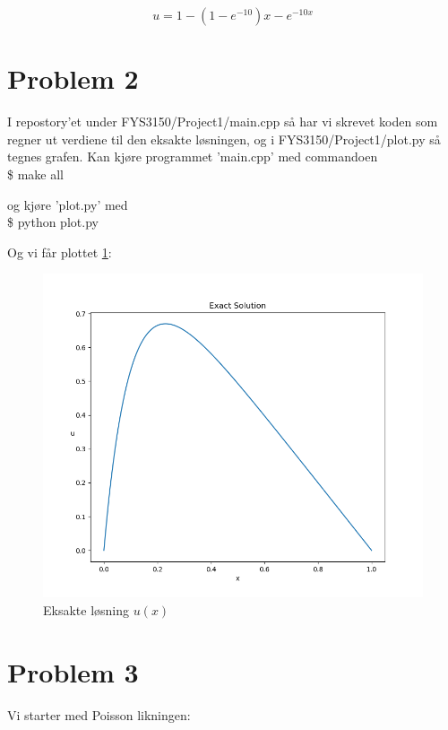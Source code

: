 \documentclass[english,notitlepage]{revtex4-1}  %
\begin{document}
\begin{equation}\label{equ}
u = 1 - (1-e^{-10})x - e^{-10x}
\end{equation}


\section*{Problem 2}

I repostory'et under FYS3150/Project1/main.cpp så har vi skrevet koden som regner ut verdiene til den eksakte løsningen, og i FYS3150/Project1/plot.py så tegnes grafen. Kan kjøre programmet 'main.cpp' med commandoen \\

\$ make all

og kjøre 'plot.py' med \\

\$ python plot.py

Og vi får plottet \ref{exact}:

\begin{figure}[h]
\centering
\includegraphics[scale=0.65]{Images/exact.png}
\caption{Eksakte løsning $u(x)$}
\label{exact}
\end{figure}

\section*{Problem 3}

Vi starter med Poisson likningen:
\end{document}
